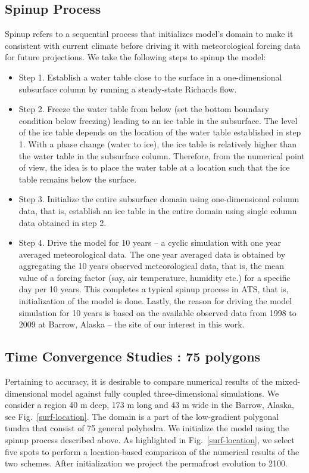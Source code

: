 \documentclass[review]{elsarticle}
\begin{document}
\subsection{Spinup Process}
Spinup refers to a sequential process that initializes model's domain to make it consistent with current climate before driving it with meteorological forcing data for future projections. We take the following steps to spinup the model:
\begin{itemize}
\item{ Step 1. Establish a water table close to the surface in a one-dimensional subsurface column by running a steady-state Richards flow.}
\item{Step 2. Freeze the water table from below (set the bottom boundary condition below freezing) leading to an ice table in the subsurface. The level of the ice table depends on the location of the water table established in step 1. With a phase change (water to ice), the ice table is relatively higher than the water table in the subsurface column. Therefore, from the numerical point of view, the idea is to place the water table at a location such that the ice table remains below the surface.}
\item{Step 3. Initialize the entire subsurface domain using one-dimensional column data, that is, establish an ice table in the entire domain using single column data obtained in step 2. 
}
\item{Step 4. Drive the model for 10 years -- a cyclic simulation with one year averaged meteorological data. The one year averaged data is obtained by aggregating the 10 years observed meteorological data, that is, the mean value of a forcing factor (say, air temperature, humidity etc.) for a specific day per 10 years. This completes a typical spinup process in ATS, that is, initialization of the model is done. Lastly, the reason for driving the model simulation for 10 years is based on the available observed data from 1998 to 2009 at Barrow, Alaska -- the site of our interest in this work.}
 \end{itemize}
 \subsection {Time Convergence Studies : 75 polygons}           
 
Pertaining to accuracy,  it is desirable to compare numerical results of the mixed-dimensional model against fully coupled three-dimensional simulations. We consider a region 40 m deep, 173 m long and 43 m wide in the Barrow, Alaska, see Fig.~\ref{surf-location}. The domain is a part of the low-gradient polygonal tundra that consist of 75 general polyhedra. We initialize the model using the spinup process described above. As highlighted in Fig.~\ref{surf-location}, we select five spots to perform a location-based comparison of the numerical results of the two schemes. After initialization we project the permafrost evolution to 2100.
\end{document}
